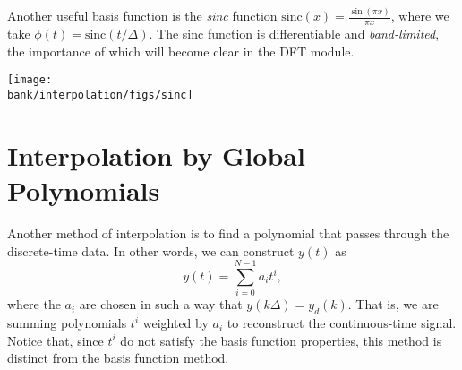 Another useful basis function is the \emph{sinc} function $\text{sinc}(x)= \frac{\sin(\pi x)}{\pi x}$, where we take $\phi(t)=\text{sinc}(t/\Delta)$.
The sinc function is differentiable and \emph{band-limited}, the importance of which will become clear in the DFT module.

\begin{center}
\texttt{[image: \\bank/interpolation/figs/sinc]}
\end{center}


\section{Interpolation by Global Polynomials}

Another method of interpolation is to find a polynomial that passes through the discrete-time data. 
In other words, we can construct $y(t)$ as
\begin{equation*}
 y(t) = \sum_{i=0}^{N-1} a_i t^i,
\end{equation*}
where the $a_i$ are chosen in such a way that $y(k\Delta)=y_d(k)$. 
That is, we are summing polynomials $t^i$ weighted by $a_i$ to reconstruct the continuous-time signal.
Notice that, since $t^i$ do not satisfy the basis function properties, this method is distinct from the basis function method.

